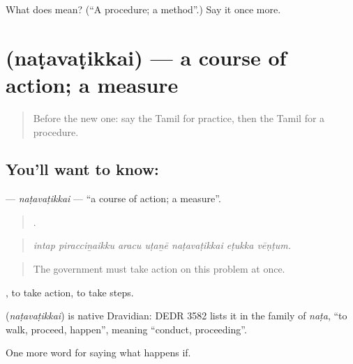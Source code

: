 \begin{tcolorbox}[breakable,colback=teal!4,colframe=teal!35!black,title={Before you move on}]
What does  mean? (\textquotedblleft{}A procedure; a method\textquotedblright{}.) Say it once more.
\end{tcolorbox}
\section[\texorpdfstring{\ta{நடவடிக்கை} (naṭavaṭikkai)}{நடவடிக்கை (naṭavaṭikkai)}]{ (naṭavaṭikkai) — a course of action; a measure}

\label{lesson:TA-C389-natavatikkai}



\begin{quote}
Before the new one: say the Tamil for practice, then the Tamil for a procedure.
\end{quote}

\subsection*{You'll want to know: }
\textbf{} — \emph{naṭavaṭikkai} — \textquotedblleft{}a course of action; a measure\textquotedblright{}.

\begin{quote}
      .
\end{quote}

\begin{quote}
\emph{intap piracciṉaikku aracu uṭaṉē naṭavaṭikkai eṭukka vēṇṭum.}
\end{quote}

\begin{quote}
The government must take action on this problem at once.
\end{quote}

 , to take action, to take steps.

\begin{cousinweb}
\textbf{} (\emph{naṭavaṭikkai}) is native Dravidian: DEDR 3582 lists it in the family of \emph{naṭa}, \textquotedblleft{}to walk, proceed, happen\textquotedblright{}, meaning \textquotedblleft{}conduct, proceeding\textquotedblright{}.
\end{cousinweb}

\begin{grammarlens}[title={What you've built}]
One more word for saying what happens if.
\end{grammarlens}

